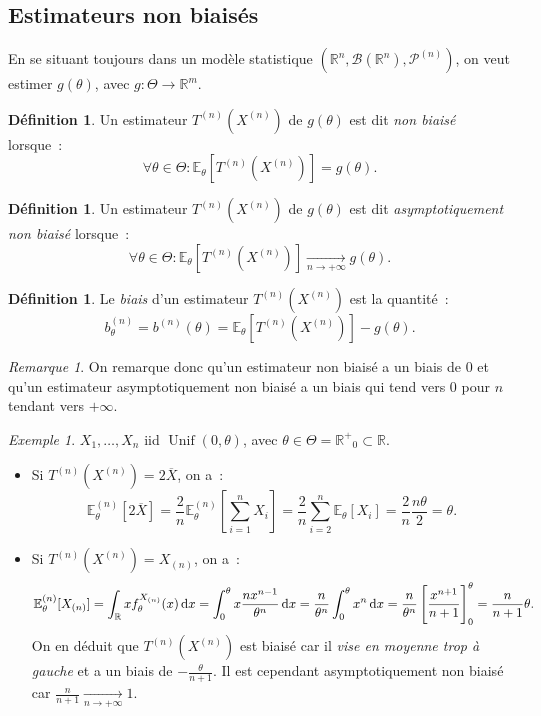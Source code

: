 \documentclass{report}
\DeclareMathOperator{\Unif}{Unif}  %
\newcommand{\E}{\mathbb E}
\newcommand{\pinfty}{{+\infty}}
\newcommand{\statmod}[4]{\left(#1^{#4}, #2\left(#1^{#4}\right), #3^{\left(#4\right)}\right)}
\newcommand{\R}{\mathbb R}
\newcommand{\Rp}{{\mathbb R^+}}
\newcommand{\Brl}{\mathcal B}  %
\theoremstyle{definition}
\newtheorem{déf}[thm]{Définition}
\theoremstyle{remark}
\newtheorem*{rmq}{Remarque}
\newtheorem{ex}{Exemple}[chapter]
\begin{document}
		\subsection{Estimateurs non biaisés}
			En se situant toujours dans un modèle statistique $\statmod \R\Brl{\mathcal P}n$, on veut estimer $g(\theta)$, avec $g : \Theta \to \R^m$.

			\begin{déf} Un estimateur $T^{(n)}(X^{(n)})$ de $g(\theta)$ est dit \textit{non biaisé} lorsque~:
			\[\forall \theta \in \Theta : \E_\theta[T^{(n)}(X^{(n)})] = g(\theta).\]
			\end{déf}

			\begin{déf} Un estimateur $T^{(n)}(X^{(n)})$ de $g(\theta)$ est dit \textit{asymptotiquement non biaisé} lorsque~:
			\[\forall \theta \in \Theta : \E_\theta[T^{(n)}(X^{(n)})] \xrightarrow[n \to \pinfty]{} g(\theta).\]
			\end{déf}

			\begin{déf} Le \textit{biais} d'un estimateur $T^{(n)}(X^ {(n)})$ est la quantité~:
			\[b^{(n)}_\theta = b^{(n)}(\theta) = \E_\theta[T^{(n)}(X^{(n)})] - g(\theta).\]
			\end{déf}

			\begin{rmq} On remarque donc qu'un estimateur non biaisé a un biais de 0 et qu'un estimateur asymptotiquement non biaisé a un biais qui tend vers 0 pour
			$n$ tendant vers $\pinfty$.
			\end{rmq}

			\begin{ex} $X_1, \ldots, X_n$ iid $\Unif(0, \theta)$, avec $\theta \in \Theta = \Rp_0 \subset \R$.
			\begin{itemize}
				\item Si $T^{(n)}(X^{(n)}) = 2\overline X$, on a~:
				\[\E_\theta^{(n)}\left[2\overline X\right] = \frac 2n\E_\theta^{(n)}\left[\sum_{i=1}^nX_i\right] = \frac 2n\sum_{i=2}^n\E_\theta[X_i]
					= \frac 2n\frac {n\theta}2 = \theta.\]
				\item Si $T^{(n)}(X^{(n)}) = X_{(n)}$, on a~:
				\[\E_\theta^{(n)}[X_{(n)}] = \int_\R xf_\theta^{X_{(n)}}(x)\dif x = \int_0^\theta x\frac {nx^{n-1}}{\theta^n}\dif x
					= \frac n{\theta^n}\int_0^\theta x^n\dif x = \frac n{\theta^n}\left[\frac {x^{n+1}}{n+1}\right]_0^\theta = \frac n{n+1}\theta.\]
				On en déduit que $T^{(n)}(X^{(n)})$ est biaisé car il \textit{vise en moyenne trop à gauche} et a un biais de $-\frac \theta{n+1}$. Il est cependant
				asymptotiquement non biaisé car $\frac n{n+1} \xrightarrow[n \to \pinfty]{} 1$.
			\end{itemize}
			\end{ex}
\end{document}
